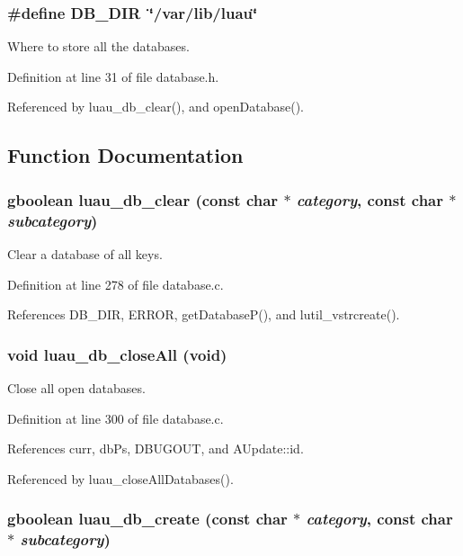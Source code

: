 \subsubsection{\setlength{\rightskip}{0pt plus 5cm}\#define DB\_\-DIR\ \char`\"{}/var/lib/luau\char`\"{}}\label{database_8h_a0}


Where to store all the databases. 



Definition at line 31 of file database.h.

Referenced by luau\_\-db\_\-clear(), and open\-Database().

\subsection{Function Documentation}
\subsubsection{\setlength{\rightskip}{0pt plus 5cm}gboolean luau\_\-db\_\-clear (const char $\ast$ {\em category}, const char $\ast$ {\em subcategory})}\label{database_8h_a9}


Clear a database of all keys. 



Definition at line 278 of file database.c.

References DB\_\-DIR, ERROR, get\-Database\-P(), and lutil\_\-vstrcreate().
\subsubsection{\setlength{\rightskip}{0pt plus 5cm}void luau\_\-db\_\-close\-All (void)}\label{database_8h_a11}


Close all open databases. 



Definition at line 300 of file database.c.

References curr, db\-Ps, DBUGOUT, and AUpdate::id.

Referenced by luau\_\-close\-All\-Databases().
\subsubsection{\setlength{\rightskip}{0pt plus 5cm}gboolean luau\_\-db\_\-create (const char $\ast$ {\em category}, const char $\ast$ {\em subcategory})}\label{database_8h_a4}




